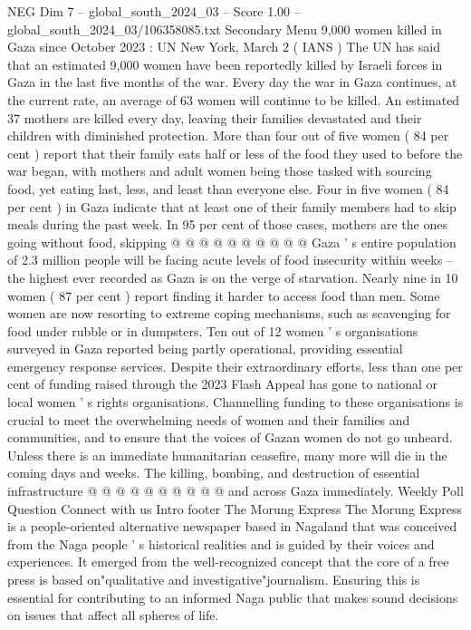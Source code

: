 \begin{textsample}{NEG Dim 7 – global\_south\_2024\_03 – Score 1.00 – global\_south\_2024\_03/106358085.txt}  \label{ex:f7_neg_293}
Secondary Menu 9,000 women killed in Gaza since October 2023 : UN New York, March 2 ( IANS ) The UN has said that an estimated 9,000 women have been reportedly killed by Israeli forces in Gaza in the last five months of the war.
Every day the war in Gaza continues, at the current rate, an average of 63 women will continue to be killed.
An estimated 37 mothers are killed every day, leaving their families devastated and their children with diminished protection.
More than four out of five women ( 84 per cent ) report that their family eats half or less of the food they used to before the war began, with mothers and adult women being those tasked with sourcing food, yet eating last, less, and least than everyone else.
Four in five women ( 84 per cent ) in Gaza indicate that at least one of their family members had to skip meals during the past week.
In 95 per cent of those cases, mothers are the ones going without food, skipping @ @ @ @ @ @ @ @ @ @ Gaza ' s entire population of 2.3 million people will be facing acute levels of food insecurity within weeks -- the highest ever recorded as Gaza is on the verge of starvation.
Nearly nine in 10 women ( 87 per cent ) report finding it harder to access food than men.
Some women are now resorting to extreme coping mechanisms, such as scavenging for food under rubble or in dumpsters.
Ten out of 12 women ' s organisations surveyed in Gaza reported being partly operational, providing essential emergency response services.
Despite their extraordinary efforts, less than one per cent of funding raised through the 2023 Flash Appeal has gone to national or local women ' s rights organisations.
Channelling funding to these organisations is crucial to meet the overwhelming needs of women and their families and communities, and to ensure that the voices of Gazan women do not go unheard.
Unless there is an immediate humanitarian ceasefire, many more will die in the coming days and weeks.
The killing, bombing, and destruction of essential infrastructure @ @ @ @ @ @ @ @ @ @ and across Gaza immediately.
Weekly Poll Question Connect with us Intro footer The Morung Express The Morung Express is a people-oriented alternative newspaper based in Nagaland that was conceived from the Naga people ' s historical realities and is guided by their voices and experiences.
It emerged from the well-recognized concept that the core of a free press is based on"qualitative and investigative"journalism.
Ensuring this is essential for contributing to an informed Naga public that makes sound decisions on issues that affect all spheres of life.

\end{textsample}
